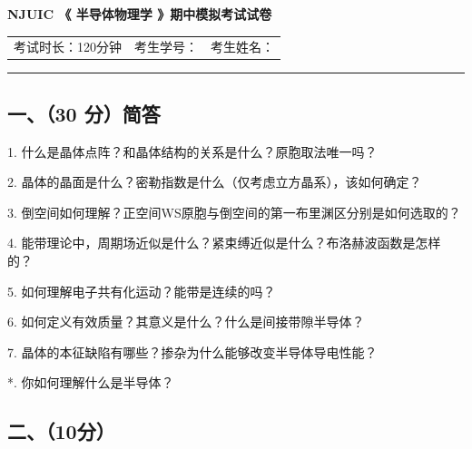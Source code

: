 \documentclass{ctexart}
\begin{document}
\vspace{1em}
\begin{center}

\textbf{\LARGE NJUIC 《 半导体物理学 》期中模拟考试试卷}
\end{center}

\begin{center}
\begin{tabular}{m{} m{} m{}}
     
     考试时长：120分钟 & 考生学号：&考生姓名：
\end{tabular}
\end{center}
\vspace{-0.3cm}
\hrule height 0.5pt

\subsection*{一、（30 分）简答}

1. 什么是晶体点阵？和晶体结构的关系是什么？原胞取法唯一吗？\par
2. 晶体的晶面是什么？密勒指数是什么（仅考虑立方晶系），该如何确定？ \par
3. 倒空间如何理解？正空间WS原胞与倒空间的第一布里渊区分别是如何选取的？\par
4. 能带理论中，周期场近似是什么？紧束缚近似是什么？布洛赫波函数是怎样的？\par
5. 如何理解电子共有化运动？能带是连续的吗？\par
6. 如何定义有效质量？其意义是什么？什么是间接带隙半导体？\par
7. 晶体的本征缺陷有哪些？掺杂为什么能够改变半导体导电性能？\par
*. 你如何理解什么是半导体？\par
\newpage

\subsection*{二、（10分）}
\end{document}
